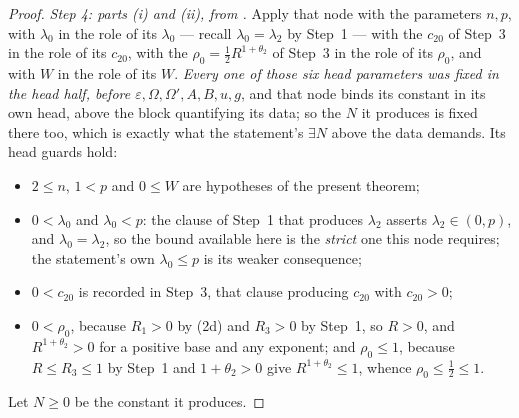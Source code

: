 \begin{proof}
\emph{Step 4: parts \textup{(i)} and \textup{(ii)}, from
.}  Apply that node with the parameters $n,p$,
with $\lambda_0$ in the role of its $\lambda_0$ --- recall $\lambda_0=\lambda_2$
by Step~1 --- with the $c_{20}$ of Step~3 in the role of its $c_{20}$, with the
$\rho_0=\tfrac12R^{1+\theta_2}$ of Step~3 in the role of its $\rho_0$, and with
$W$ in the role of its $W$.  \emph{Every one of those six head parameters was
fixed in the head half, before $\varepsilon,\Omega,\Omega',A,B,u,g$}, and that
node binds its constant in its own head, above the block quantifying its data;
so the $N$ it produces is fixed there too, which is exactly what the
statement's $\exists N$ above the data demands.  Its head guards hold:
\begin{itemize}
\item $2\le n$, $1<p$ and $0\le W$ are hypotheses of the present theorem;
\item $0<\lambda_0$ and $\lambda_0<p$: the clause of Step~1 that produces
  $\lambda_2$ asserts $\lambda_2\in(0,p)$, and $\lambda_0=\lambda_2$, so the
  bound available here is the \emph{strict} one this node requires; the
  statement's own $\lambda_0\le p$ is its weaker consequence;
\item $0<c_{20}$ is recorded in Step~3, that clause producing $c_{20}$ with
  $c_{20}>0$;
\item $0<\rho_0$, because $R_1>0$ by (2d) and $R_3>0$ by Step~1, so $R>0$, and
  $R^{1+\theta_2}>0$ for a positive base and any exponent; and $\rho_0\le1$,
  because $R\le R_3\le1$ by Step~1 and $1+\theta_2>0$ give
  $R^{1+\theta_2}\le1$, whence $\rho_0\le\tfrac12\le1$.
\end{itemize}
Let $N\ge0$ be the constant it produces.


\end{proof}

